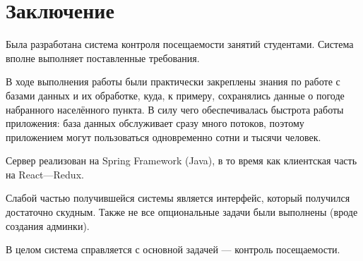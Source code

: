 \section*{Заключение}
Была разработана система контроля посещаемости занятий студентами.
Система вполне выполняет поставленные требования.

В ходе выполнения работы были практически закреплены знания по работе с базами данных и их обработке, куда, к примеру, сохранялись данные о погоде набранного населённого пункта.
В силу чего обеспечивалась быстрота работы приложения: база данных обслуживает сразу много потоков, поэтому приложением могут пользоваться одновременно сотни и тысячи человек.

Сервер реализован на Spring Framework (Java), в то время как клиентская часть на React---Redux.

Слабой частью получившейся системы является интерфейс, который получился достаточно скудным.
Также не все опциональные задачи были выполнены (вроде создания админки).

В целом система справляется с основной задачей --- контроль посещаемости.
